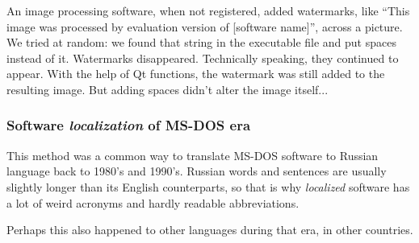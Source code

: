 An image processing software, when not registered, added watermarks,
like ``This image was processed by evaluation version of [software name]'', across a picture.
We tried at random: we found that string in the executable file and put spaces instead of it.
Watermarks disappeared.
Technically speaking, they continued to appear.
With the help of Qt functions, the watermark was still added to the resulting image.
But adding spaces didn't alter the image itself...

\subsubsection{Software \emph{localization} of MS-DOS era}

This method was a common way to translate MS-DOS software to Russian language back to 1980's and 1990's.
Russian words and sentences are usually slightly longer than its English counterparts, so that is why \emph{localized}
software has a lot of weird acronyms and hardly readable abbreviations.

Perhaps this also happened to other languages during that era, in other countries.
